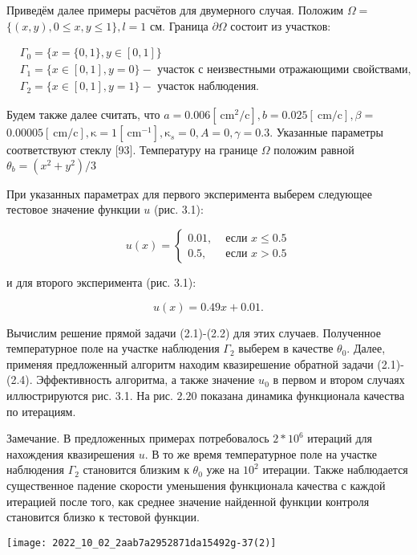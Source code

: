 \documentclass[10pt]{article}
\begin{document}
Приведём далее примеры расчётов для двумерного случая. Положим $\Omega=$ $\{(x, y), 0 \leqslant x, y \leqslant 1\}, l=1$ см. Граница $\partial \Omega$ состоит из участков:

$$
\begin{aligned}
&\Gamma_{0}=\{x=\{0,1\}, y \in[0,1]\} \\
&\Gamma_{1}=\{x \in[0,1], y=0\}-\text { участок с неизвестными отражающими свойствами, } \\
&\Gamma_{2}=\{x \in[0,1], y=1\}-\text { участок наблюдения. }
\end{aligned}
$$

Будем также далее считать, что $a=0.006\left[\mathrm{~cm}^{2} / \mathrm{c}\right], b=0.025[\mathrm{~cm} / \mathrm{c}], \beta=$ $0.00005[\mathrm{~cm} / \mathrm{c}], \mathrm{\kappa}=1\left[\mathrm{~cm}^{-1}\right], \mathrm{\kappa}_{s}=0, A=0, \gamma=0.3$. Указанные параметры соответствуют стеклу [93]. Температуру на границе $\Omega$ положим равной $\theta_{b}=\left(x^{2}+y^{2}\right) / 3$

При указанных параметрах для первого эксперимента выберем следующее тестовое значение функции $u$ (рис. 3.1):

$$
u(x)= \begin{cases}0.01, & \text { если } x \leqslant 0.5 \\ 0.5, & \text { если } x>0.5\end{cases}
$$

и для второго эксперимента (рис. 3.1):

$$
u(x)=0.49 x+0.01 .
$$

Вычислим решение прямой задачи (2.1)-(2.2) для этих случаев. Полученное температурное поле на участке наблюдения $\Gamma_{2}$ выберем в качестве $\theta_{0}$. Далее, применяя предложенный алгоритм находим квазирешение обратной задачи (2.1)-(2.4). Эффективность алгоритма, а также значение $u_{0}$ в первом и втором случаях иллюстрируются рис. 3.1. На рис. $2.20$ показана динамика функционала качества по итерациям.

Замечание. В предложенных примерах потребовалось $2 * 10^{6}$ итераций для нахождения квазирешения $u$. В то же время температурное поле на участке наблюдения $\Gamma_{2}$ становится близким к $\theta_{0}$ уже на $10^{2}$ итерации. Также наблюдается существенное падение скорости уменьшения функционала качества с каждой итерацией после того, как среднее значение найденной функции контроля становится близко к тестовой функции.

\begin{center}
\texttt{[image: 2022\_10\_02\_2aab7a2952871da15492g-37(2)]}
\end{center}
\end{document}
